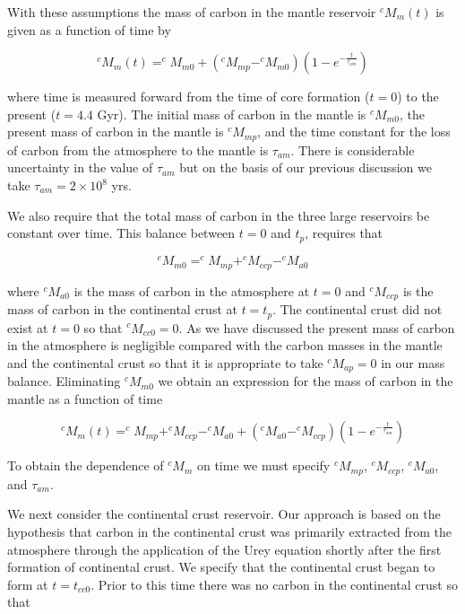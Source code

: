 With these assumptions the mass of carbon in the mantle reservoir $^cM_{m}(t)$ is given as a function of time by

\begin{equation}
  ^cM_{m}(t) = ^cM_{m0} + (^cM_{mp} - ^cM_{m0}) (1 - e^{-\frac{t}{\tau_{am}}})
\end{equation}

where time is measured forward from the time of core formation ($t=0$) to the present ($t=4.4$ Gyr). The initial mass of carbon in the mantle is $^cM_{m0}$, the present mass of carbon in the mantle is $^cM_{mp}$, and the time constant for the loss of carbon from the atmosphere to the mantle is $\tau_{am}$. There is considerable uncertainty in the value of $\tau_{am}$ but on the basis of our previous discussion we take $\tau_{am} = 2 \times 10^8$ yrs.

We also require that the total mass of carbon in the three large reservoirs be constant over time. This balance between $t=0$ and $t_p$, requires that

\begin{equation}
  ^cM_{m0} = ^cM_{mp} + ^cM_{ccp} - ^cM_{a0}
\end{equation}

where $^cM_{a0}$ is the mass of carbon in the atmosphere at $t=0$ and $^cM_{ccp}$ is the mass of carbon in the continental crust at $t=t_p$. The continental crust did not exist at $t=0$ so that $^cM_{cc0}=0$. As we have discussed the present mass of carbon in the atmosphere is negligible compared with the carbon masses in the mantle and the continental crust so that it is appropriate to take $^cM_{ap}=0$ in our mass balance. Eliminating $^cM_{m0}$ we obtain an expression for the mass of carbon in the mantle as a function of time

\begin{equation}
  ^cM_{m}(t) = ^cM_{mp} + ^cM_{ccp} - ^cM_{a0} + (^cM_{a0} - ^cM_{ccp}) (1 - e^{-\frac{t}{\tau_{am}}})
\end{equation}

To obtain the dependence of $^cM_{m}$ on time we must specify $^cM_{mp}$, $^cM_{ccp}$, $^cM_{a0}$, and $\tau_{am}$.


We next consider the continental crust reservoir. Our approach is based on the hypothesis that carbon in the continental crust was primarily extracted from the atmosphere through the application of the Urey equation shortly after the first formation of continental crust. We specify that the continental crust began to form at $t=t_{cc0}$. Prior to this time there was no carbon in the continental crust so that

